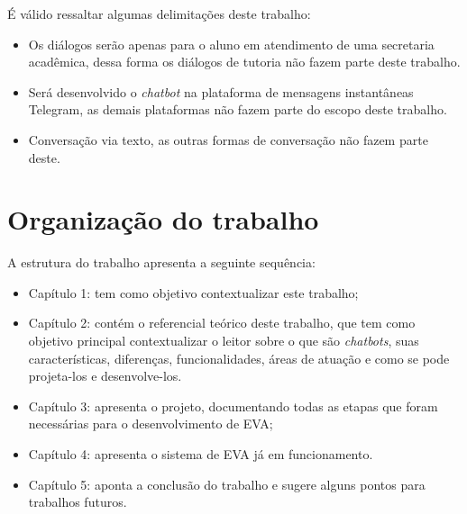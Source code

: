 É válido ressaltar algumas delimitações deste trabalho:

\begin{itemize}
    \item Os diálogos serão apenas para o aluno em atendimento de uma secretaria acadêmica, dessa forma os diálogos de tutoria não fazem parte deste trabalho.
    \item Será desenvolvido o \textit{chatbot} na plataforma de mensagens instantâneas Telegram, as demais plataformas não fazem parte do escopo deste trabalho.
    \item Conversação via texto, as outras formas de conversação não fazem parte deste.
\end{itemize}


\section{Organização do trabalho}

A estrutura do trabalho apresenta a seguinte sequência:

\begin{itemize}
    \item Capítulo 1: tem como objetivo contextualizar este trabalho; 
    \item Capítulo 2: contém o referencial teórico deste trabalho, que tem como objetivo principal contextualizar o leitor sobre o que são \textit{chatbots}, suas características, diferenças, funcionalidades, áreas de atuação e como se pode projeta-los e desenvolve-los.
    \item Capítulo 3: apresenta o projeto, documentando todas as etapas que foram necessárias para o desenvolvimento de EVA;
    \item Capítulo 4: apresenta o sistema de EVA já em funcionamento.
    \item Capítulo 5: aponta a conclusão do trabalho e sugere alguns pontos para trabalhos futuros.
\end{itemize}
